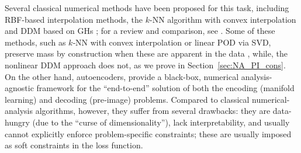 \documentclass{article}
\begin{document}
Several classical numerical methods have been proposed for this task, including  RBF-based interpolation methods, the $k$-NN algorithm with convex interpolation \cite{fix1985discriminatory} and DDM based on GHs \cite{evangelou2022double,coifman2006geometric}; for a review and comparison, see \cite{chiavazzo2014reduced,papaioannou2022time}. Some of these methods, such as $k$‑NN with convex interpolation or linear POD via SVD, preserve mass by construction when these are apparent in the data \cite{viola2025pde,alvarez2025next}, while, the nonlinear DDM approach does not, as we prove in Section~\ref{sec:NA_PI_cons}. %
On the other hand, autoencoders, \cite{hinton2006reducing,makhzani2015adversarial,peterfreund2020local,vlachas2022multiscale} provide  a black-box, numerical analysis-agnostic framework for the ``end-to-end'' solution of both the encoding (manifold learning) and decoding (pre‑image) problems.
Compared to classical numerical-analysis algorithms, however, they suffer from several drawbacks: they are data-hungry (due to the ``curse of dimensionality''), lack interpretability, and usually cannot explicitly enforce problem-specific constraints; these are usually imposed as soft constraints in the loss function.
\end{document}
